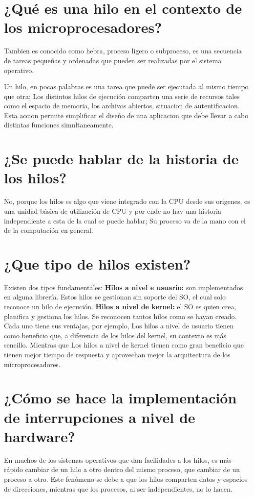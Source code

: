 \documentclass{article}
\begin{document}
\newpage
\Large
\section{¿Qué es una hilo en el contexto de los microprocesadores?}

Tambien es conocido como hebra, proceso ligero o subproceso, es una secuencia de tareas pequeñas y ordenadas que pueden ser realizadas por el sistema operativo.

Un hilo, en pocas palabras es una tarea que puede ser ejecutada al mismo tiempo que otra; Los distintos hilos de ejecución comparten una serie de recursos tales como el espacio de memoria, los archivos abiertos, situacion de autentificacion. Esta accion permite simplificar el diseño de una aplicacion que debe llevar a cabo distintas funciones simultaneamente.



\section{¿Se puede hablar de la historia de los hilos?}
No, porque los hilos es algo que viene integrado con la CPU desde sus origenes, es una unidad básica de utilización de CPU y por ende no hay una historia independiente a esta de la cual se puede hablar; Su proceso va de la mano con el de la computación en general.
\section{¿Que tipo de hilos existen?}
Existen dos tipos fundamentales:
\newline
\textbf{Hilos a nivel e usuario:} son implementados en alguna librería. Estos hilos se gestionan
sin soporte del SO, el cual solo reconoce un hilo de ejecución.
\newline
\textbf{Hilos a nivel de kernel:} el SO es quien crea, planifica y gestiona los hilos. Se
reconocen tantos hilos como se hayan creado.
\newline
Cada uno tiene sus ventajas, por ejemplo, Los hilos a nivel de usuario tienen como beneficio que, a diferencia de los hilos del kernel, su contexto es más sencillo. Mientras que Los hilos a nivel de kernel tienen como gran beneficio que tienen mejor tiempo de respuesta y aprovechan mejor la arquitectura de los microprocesadores.
\section{¿Cómo se hace la implementación de interrupciones a nivel de hardware?}
En muchos de los sistemas operativos que dan facilidades a los hilos, es más rápido cambiar de un hilo a otro dentro del mismo proceso, que cambiar de un proceso a otro. Este fenómeno se debe a que los hilos comparten datos y espacios de direcciones, mientras que los procesos, al ser independientes, no lo hacen.
\end{document}
